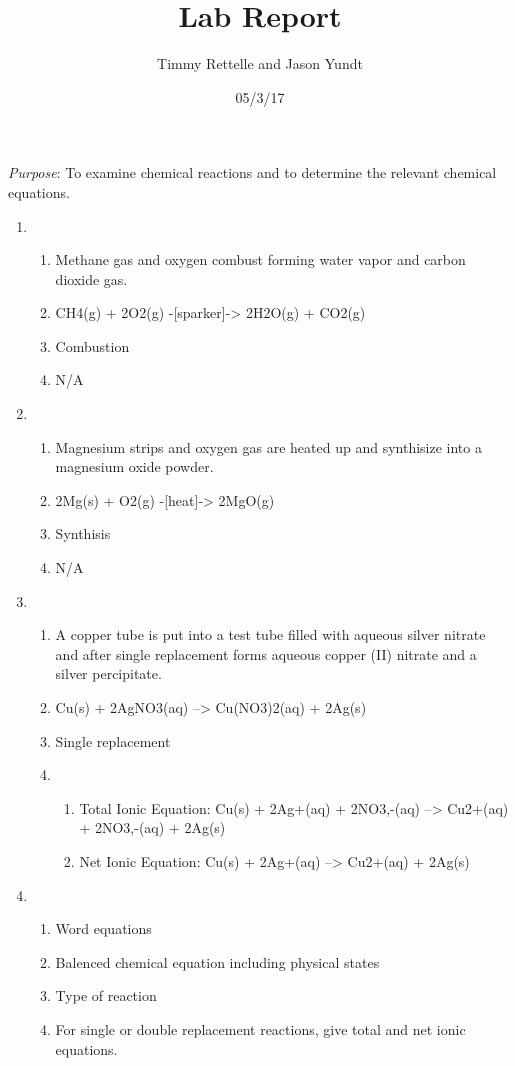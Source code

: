 \documentclass{article}
\title{Lab Report}
\author{Timmy Rettelle and Jason Yundt}
\date{05/3/17}
\begin{document}
   \maketitle
   \textit{Purpose}: To examine chemical reactions and to determine the relevant chemical equations.
   \begin{enumerate}[label=\Roman*.]
    
    \item %
    \begin{enumerate}[label=\arabic*.]
     \item Methane gas and oxygen combust forming water vapor and carbon dioxide gas.
     \item CH4(g) + 2O2(g) -[sparker]-> 2H2O(g) + CO2(g)
     \item Combustion
     \item N/A
    \end{enumerate}
    
    \item %
    \begin{enumerate}[label=\arabic*.]
     \item Magnesium strips and oxygen gas are heated up and synthisize into a magnesium oxide powder.
     \item 2Mg(s) + O2(g) -[heat]-> 2MgO(g)
     \item Synthisis
     \item N/A
    \end{enumerate}
    
    \item %
    \begin{enumerate}[label=\arabic*.]
     \item A copper tube is put into a test tube filled with aqueous silver nitrate and after single replacement forms aqueous copper (II) nitrate and a silver percipitate.
     \item Cu(s) + 2AgNO3(aq) --> Cu(NO3)2(aq) + 2Ag(s)
     \item Single replacement
     \item 
      \begin{enumerate}[label=]
       \item Total Ionic Equation: Cu(s) + 2Ag+(aq) + 2NO3,-(aq) --> Cu2+(aq) + 2NO3,-(aq) + 2Ag(s)
       \item Net Ionic Equation: Cu(s) + 2Ag+(aq) --> Cu2+(aq) + 2Ag(s)
      \end{enumerate}
    \end{enumerate}
    
    \item 
    \begin{enumerate}[label=\arabic*.]
     \item Word equations
     \item Balenced chemical equation including physical states
     \item Type of reaction
     \item For single or double replacement reactions, give total and net ionic equations.
    \end{enumerate}
   
   \end{enumerate}
\end{document}
